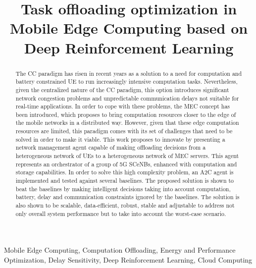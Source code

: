 \documentclass[conference]{IEEEtran}
\begin{document}
\title{Task offloading optimization in Mobile Edge Computing based on Deep Reinforcement Learning}

\author{
}

\maketitle

\begin{abstract}
The \acrfull{CC} paradigm has risen in recent years as a solution to a need for computation and battery constrained \acrfull{UE} to run increasingly intensive computation tasks. Nevertheless, given the centralized nature of the \acrshort{CC} paradigm, this option introduces significant network congestion problems and unpredictable communication delays not suitable for real-time applications. In order to cope with these problems, the \acrfull{MEC} concept has been introduced, which proposes to bring computation resources closer to the edge of the mobile networks in a distributed way. However, given that these edge computation resources are limited, this paradigm comes with its set of challenges that need to be solved in order to make it viable. This work proposes to innovate by presenting a network management agent capable of making offloading decisions from a heterogeneous network of \acrshort{UE}s to a heterogeneous network of \acrshort{MEC} servers. This agent represents an orchestrator of a group of 5G \acrfull{SCeNBs}, enhanced with computation and storage capabilities. In order to solve this high complexity problem, an \acrfull{A2C} agent is implemented and tested against several baselines. The proposed solution is shown to beat the baselines by making intelligent decisions taking into
account computation, battery, delay and communication constraints ignored by the baselines. The solution is also shown to be scalable, data-efficient, robust, stable and adjustable to address not only overall system performance but to take into account the worst-case scenario.
\end{abstract}

\begin{IEEEkeywords}
Mobile Edge Computing, Computation Offloading, Energy and Performance Optimization, Delay Sensitivity, Deep Reinforcement Learning, Cloud Computing
\end{IEEEkeywords}
\end{document}
